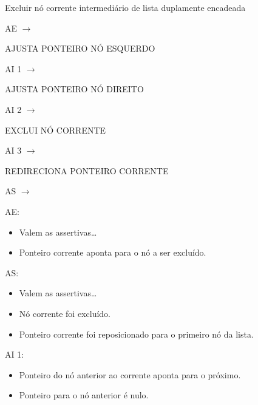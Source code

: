 \documentclass[
	12pt, %
]{fphw}
\begin{document}
\begin{doublespace}
\begin{figure}[h!]
    \end{figure}

    \begin{algorithm}[h]

        \caption{Excluir nó corrente intermediário de lista duplamente encadeada}

        \SetAlgoLined
        AE $\longrightarrow$

        \Indp\Inicio
        {
        AJUSTA PONTEIRO NÓ ESQUERDO

        \Indm AI 1 $\longrightarrow$

        \Indp AJUSTA PONTEIRO NÓ DIREITO

        \Indm AI 2 $\longrightarrow$

        \Indp EXCLUI NÓ CORRENTE

        \Indm AI 3 $\longrightarrow$

        \Indp REDIRECIONA PONTEIRO CORRENTE

        }

        \Indm AS $\longrightarrow$

    \end{algorithm}

    AE:

    \begin{itemize}

        \item Valem as assertivas\dots
        \item Ponteiro corrente aponta para o nó a ser excluído.

    \end{itemize}

    AS:

    \begin{itemize}

        \item Valem as assertivas\dots
        \item Nó corrente foi excluído.
        \item Ponteiro corrente foi reposicionado para o primeiro nó da lista.

    \end{itemize}

    AI 1:

    \begin{itemize}

        \item Ponteiro do nó anterior ao corrente aponta para o próximo.
        \item Ponteiro para o nó anterior é nulo.


\end{itemize}
\end{doublespace}
\end{document}
